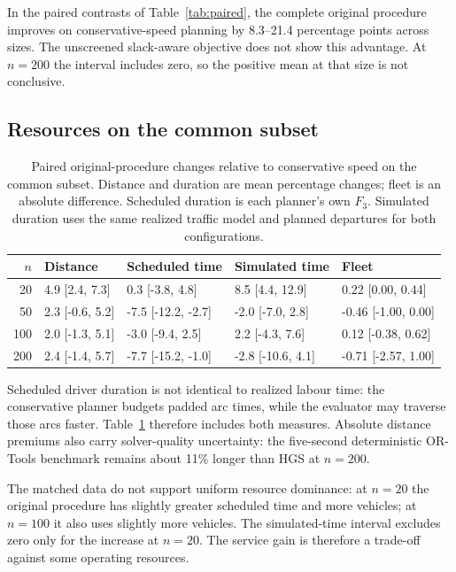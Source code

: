 In the paired contrasts of Table~\ref{tab:paired}, the complete original procedure improves on conservative-speed planning by 8.3--21.4 percentage points across sizes. The unscreened slack-aware objective does not show this advantage. At $n=200$ the interval includes zero, so the positive mean at that size is not conclusive.

\subsection{Resources on the common subset}

\begin{table}[htbp]
\centering
\scriptsize
\caption{Paired original-procedure changes relative to conservative speed on the common subset. Distance and duration are mean percentage changes; fleet is an absolute difference. Scheduled duration is each planner's own $F_3$. Simulated duration uses the same realized traffic model and planned departures for both configurations.}
\label{tab:cost}
\begin{tabular}{rllll}
\toprule
$n$ & Distance & Scheduled time & Simulated time & Fleet\\
\midrule
20 & 4.9 [2.4, 7.3] & 0.3 [-3.8, 4.8] & 8.5 [4.4, 12.9] & 0.22 [0.00, 0.44]\\
50 & 2.3 [-0.6, 5.2] & -7.5 [-12.2, -2.7] & -2.0 [-7.0, 2.8] & -0.46 [-1.00, 0.00]\\
100 & 2.0 [-1.3, 5.1] & -3.0 [-9.4, 2.5] & 2.2 [-4.3, 7.6] & 0.12 [-0.38, 0.62]\\
200 & 2.4 [-1.4, 5.7] & -7.7 [-15.2, -1.0] & -2.8 [-10.6, 4.1] & -0.71 [-2.57, 1.00]\\
\bottomrule
\end{tabular}
\end{table}


Scheduled driver duration is not identical to realized labour time: the conservative planner budgets padded arc times, while the evaluator may traverse those arcs faster. Table~\ref{tab:cost} therefore includes both measures. Absolute distance premiums also carry solver-quality uncertainty: the five-second deterministic OR-Tools benchmark remains about 11\% longer than HGS at $n=200$.

The matched data do not support uniform resource dominance: at $n=20$ the original procedure has slightly greater scheduled time and more vehicles; at $n=100$ it also uses slightly more vehicles. The simulated-time interval excludes zero only for the increase at $n=20$. The service gain is therefore a trade-off against some operating resources.

